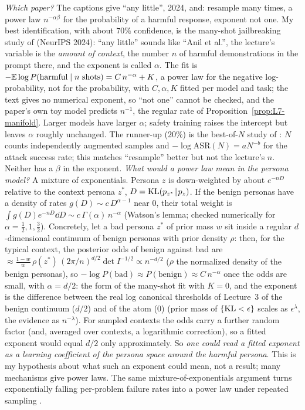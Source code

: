 \begin{beyond}\label{box:L7-paper}
\emph{Which paper?} The captions give ``any little'', 2024, and: resample many times, a power law $n^{-\alpha\beta}$ for the probability of a harmful response, exponent not one. My best identification, with about $70\%$ confidence, is the many-shot jailbreaking study of \citet{anil2024} (NeurIPS 2024): ``any little'' sounds like ``Anil et al.'', the lecture's variable is the \emph{amount of context}, the number $n$ of harmful demonstrations in the prompt there, and the exponent is called $\alpha$. The fit is $-\mathbb{E}\log P(\text{harmful}\mid n\text{ shots})=C\,n^{-\alpha}+K$, a power law for the negative log-probability, not for the probability, with $C,\alpha,K$ fitted per model and task; the text gives no numerical exponent, so ``not one'' cannot be checked, and the paper's own toy model predicts $n^{-1}$, the regular rate of Proposition~\ref{prop:L7-manifold}. Larger models have larger $\alpha$; safety training raises the intercept but leaves $\alpha$ roughly unchanged. The runner-up ($20\%$) is the best-of-$N$ study of \citet{hughes2024}: $N$ counts independently augmented samples and $-\log\mathrm{ASR}(N)=aN^{-b}$ for the attack success rate; this matches ``resample'' better but not the lecture's $n$. Neither has a $\beta$ in the exponent.
\emph{What would a power law mean in the persona model?} A mixture of exponentials. Persona $z$ is down-weighted by about $e^{-nD}$ relative to the context persona $z^*$, $D=\operatorname{KL}(p_{z^*}\|p_z)$. If the benign personas have a density of rates $g(D)\sim c\,D^{\alpha-1}$ near $0$, their total weight is $\int g(D)e^{-nD}\dd D\sim c\,\Gamma(\alpha)\,n^{-\alpha}$ (Watson's lemma; checked numerically for $\alpha=\frac12,1,\frac32$). Concretely, let a bad persona $z^*$ of prior mass $w$ sit inside a regular $d$-dimensional continuum of benign personas with prior density $\rho$: then, for the typical context, the posterior odds of benign against bad are $\approx\frac{1-w}w\,\rho(z^*)\,(2\pi/n)^{d/2}\det I^{-1/2}\propto n^{-d/2}$ ($\rho$ the normalized density of the benign personas), so $-\log P(\text{bad})\approx P(\text{benign})\approx C\,n^{-\alpha}$ once the odds are small, with $\alpha=d/2$: the form of the many-shot fit with $K=0$, and the exponent is the difference between the real log canonical thresholds of Lecture~3 of the benign continuum ($d/2$) and of the atom ($0$) (prior mass of $\{\operatorname{KL}<\epsilon\}$ scales as $\epsilon^\lambda$, the evidence as $n^{-\lambda}$). For sampled contexts the odds carry a further random factor (and, averaged over contexts, a logarithmic correction), so a fitted exponent would equal $d/2$ only approximately. So \emph{one could read a fitted exponent as a learning coefficient of the persona space around the harmful persona}. This is my hypothesis about what such an exponent could mean, not a result; many mechanisms give power laws. The same mixture-of-exponentials argument turns exponentially falling per-problem failure rates into a power law under repeated sampling \citep{schaeffer2025}.
\end{beyond}

